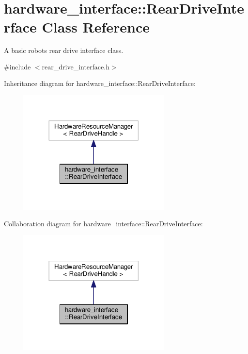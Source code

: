 \hypertarget{classhardware__interface_1_1RearDriveInterface}{}\section{hardware\+\_\+interface\+:\+:Rear\+Drive\+Interface Class Reference}
\label{classhardware__interface_1_1RearDriveInterface}


A basic robot\textquotesingle{}s rear drive interface class.  




{\ttfamily \#include $<$rear\+\_\+drive\+\_\+interface.\+h$>$}



Inheritance diagram for hardware\+\_\+interface\+:\+:Rear\+Drive\+Interface\+:\nopagebreak
\begin{figure}[H]
\begin{center}
\leavevmode
\includegraphics[width=218pt]{classhardware__interface_1_1RearDriveInterface__inherit__graph}
\end{center}
\end{figure}


Collaboration diagram for hardware\+\_\+interface\+:\+:Rear\+Drive\+Interface\+:\nopagebreak
\begin{figure}[H]
\begin{center}
\leavevmode
\includegraphics[width=218pt]{classhardware__interface_1_1RearDriveInterface__coll__graph}
\end{center}
\end{figure}


